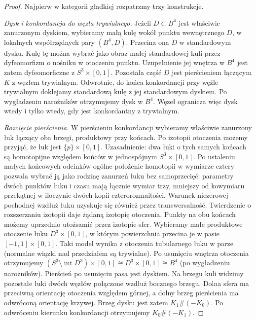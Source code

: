 \begin{proof}
Najpierw w kategorii gładkiej rozpatrzmy trzy
konstrukcje.

\emph{Dysk i konkordancja do węzła trywialnego.}
Jeżeli $D\subset B^4$ jest właściwie zanurzonym
dyskiem, wybieramy małą kulę wokół punktu
wewnętrznego $D$, w lokalnych współrzędnych pary
$(B^4,D)$. Przecina ona $D$ w standardowym dysku.
Kulę tę można wybrać jako obraz małej standardowej
kuli przez dyfeomorfizm o nośniku w otoczeniu
punktu. Uzupełnienie jej wnętrza w $B^4$ jest
zatem dyfeomorficzne z $S^3\times[0,1]$.
Pozostała część $D$ jest pierścieniem łączącym
$K$ z węzłem trywialnym. Odwrotnie, do końca
konkordancji przy węźle trywialnym doklejamy
standardową kulę z jej standardowym dyskiem.
Po wygładzeniu narożników otrzymujemy dysk
w $B^4$. Węzeł ogranicza więc dysk wtedy
i tylko wtedy, gdy jest konkordantny z trywialnym.

\emph{Rozcięcie pierścienia.}
W pierścieniu konkordancji wybieramy właściwie
zanurzony łuk łączący oba brzegi, produktowy
przy końcach. Po izotopii otoczenia możemy
przyjąć, że łuk jest $\{p\}\times[0,1]$.
Uzasadnienie: dwa łuki o tych samych końcach
są homotopijne względem końców w jednospójnym
$S^3\times[0,1]$. Po ustaleniu małych
końcowych odcinków ogólne położenie homotopii
w wymiarze cztery pozwala wybrać ją jako
rodzinę zanurzeń łuku bez samoprzecięć:
parametry dwóch punktów łuku i czasu mają
łącznie wymiar trzy, mniejszy od kowymiaru
przekątnej w iloczynie dwóch kopii
czterorozmaitości. Warunek niezerowej
pochodnej wzdłuż łuku uzyskuje się również
przez transwersalność. Twierdzenie o
rozszerzaniu izotopii daje żądaną izotopię
otoczenia. Punkty na obu końcach możemy
uprzednio utożsamić przez izotopie sfer.
Wybieramy małe produktowe otoczenie łuku
$D^3\times[0,1]$, w którym powierzchnia
przecina je w pasie $[-1,1]\times[0,1]$.
Taki model wynika z otoczenia tubularnego
łuku w parze (normalne wiązki nad przedziałem
są trywialne). Po usunięciu wnętrza otoczenia
otrzymujemy $(S^3\setminus\operatorname{int}D^3)
\times[0,1]\cong D^3\times[0,1]\cong B^4$
(po wygładzeniu narożników).
Pierścień po usunięciu pasa jest dyskiem.
Na brzegu kuli widzimy pozostałe łuki dwóch
węzłów połączone wzdłuż bocznego brzegu.
Dolna sfera ma przeciwną orientację otoczenia
względem górnej, a dolny brzeg pierścienia
ma odwróconą orientację krzywej.
Brzeg dysku jest zatem $K_1\#(-K_0)$.
Po odwróceniu kierunku konkordancji
otrzymujemy $K_0\#(-K_1)$.


\end{proof}
